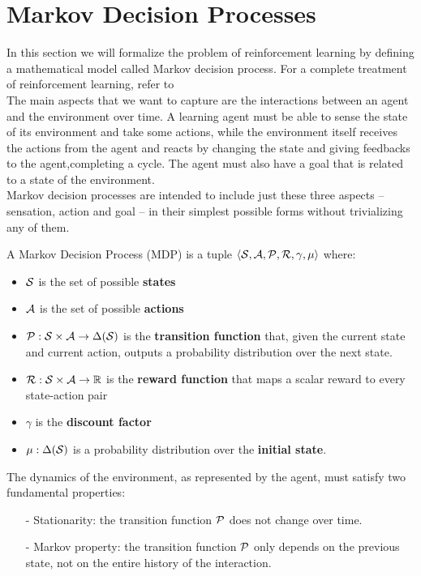 \section{Markov Decision Processes}
\label{sec:mdp}
In this section we will formalize the problem of reinforcement learning by defining a mathematical model called Markov decision process. For a complete treatment of reinforcement learning, refer to \cite{sutton1998reinforcement}\\
The main aspects that we want to capture are the interactions between an agent and the environment over time. A learning agent must be able to sense the state of its environment and take some actions, while the environment itself receives the actions from the agent and reacts by changing the state and giving feedbacks to the agent,completing a cycle.
The agent must also have a goal that is related to a state of the environment.\\
Markov decision processes are intended to include just these three aspects -- sensation, action and goal -- in their simplest possible forms without trivializing any of them.
\newpage
\begin{definition}
A Markov Decision Process (MDP) is a tuple $\left\langle \mathcal{S}, \mathcal{A}, \mathcal{P}, \mathcal{R}, \gamma, \mu \right\rangle$  where:
\begin{itemize}
\item $\mathcal{S}$ is the set of possible \textbf{states}
\item $\mathcal{A}$ is the set of possible \textbf{actions}
\item $\mathcal{P} : \mathcal{S} \times \mathcal{A} \rightarrow \Delta (\mathcal{S})$ is the \textbf{transition function} that, given the current state and current action, outputs a probability distribution over the next state.
\item $\mathcal{R} : \mathcal{S} \times \mathcal{A} \rightarrow \mathbb{R}$ is the \textbf{reward function} that maps a scalar reward to every state-action pair
\item $\gamma$ is the \textbf{discount factor}
\item $\mu : \Delta ( \mathcal{S} )$ is a probability distribution over the \textbf{initial state}. 
\end{itemize}
\end{definition}

The dynamics of the environment, as represented by the agent, must satisfy two fundamental properties:
\begin{itemize}
\item[-] Stationarity: the transition function $\mathcal{P}$ does not change over time.
\item[-] Markov property: the transition function $\mathcal{P}$ only depends on the previous state, not on the entire history of the interaction.
\end{itemize}


